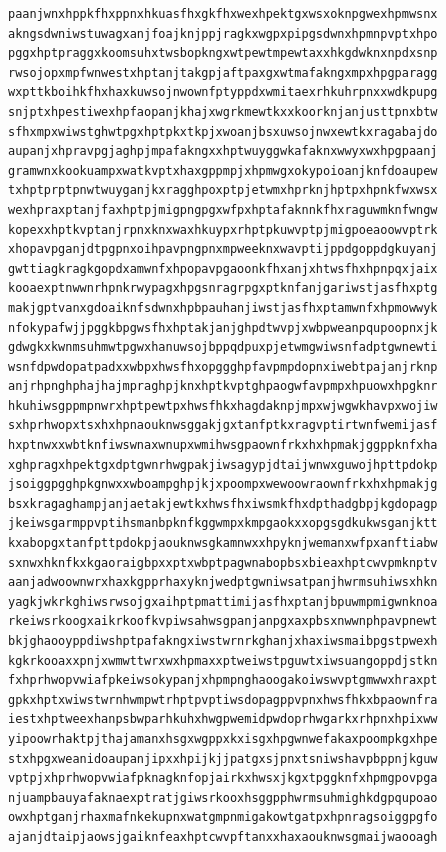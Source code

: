 \documentclass[11pt,letterpaper]{exam}
\begin{document}
\begin{questions}
\begin{verbatim}
paanjwnxhppkfhxppnxhkuasfhxgkfhxwexhpektgxwsxoknpgwexhpmwsnx
akngsdwniwstuwagxanjfoajknjppjragkxwgpxpipgsdwnxhpmnpvptxhpo
pggxhptpraggxkoomsuhxtwsbopkngxwtpewtmpewtaxxhkgdwknxnpdxsnp
rwsojopxmpfwnwestxhptanjtakgpjaftpaxgxwtmafakngxmpxhpgparagg
wxpttkboihkfhxhaxkuwsojnwownfptyppdxwmitaexrhkuhrpnxxwdkpupg
snjptxhpestiwexhpfaopanjkhajxwgrkmewtkxxkoorknjanjusttpnxbtw
sfhxmpxwiwstghwtpgxhptpkxtkpjxwoanjbsxuwsojnwxewtkxragabajdo
aupanjxhpravpgjaghpjmpafakngxxhptwuyggwkafaknxwwyxwxhpgpaanj
gramwnxkookuampxwatkvptxhaxgppmpjxhpmwgxokypoioanjknfdoaupew
txhptprptpnwtwuyganjkxragghpoxptpjetwmxhprknjhptpxhpnkfwxwsx
wexhpraxptanjfaxhptpjmigpngpgxwfpxhptafaknnkfhxraguwmknfwngw
kopexxhptkvptanjrpnxknxwaxhkuypxrhptpkuwvptpjmigpoeaoowvptrk
xhopavpganjdtpgpnxoihpavpngpnxmpweeknxwavptijppdgoppdgkuyanj
gwttiagkragkgopdxamwnfxhpopavpgaoonkfhxanjxhtwsfhxhpnpqxjaix
kooaexptnwwnrhpnkrwypagxhpgsnragrpgxptknfanjgariwstjasfhxptg
makjgptvanxgdoaiknfsdwnxhpbpauhanjiwstjasfhxptamwnfxhpmowwyk
nfokypafwjjpggkbpgwsfhxhptakjanjghpdtwvpjxwbpweanpqupoopnxjk
gdwgkxkwnmsuhmwtpgwxhanuwsojbppqdpuxpjetwmgwiwsnfadptgwnewti
wsnfdpwdopatpadxxwbpxhwsfhxopggghpfavpmpdopnxiwebtpajanjrknp
anjrhpnghphajhajmpraghpjknxhptkvptghpaogwfavpmpxhpuowxhpgknr
hkuhiwsgppmpnwrxhptpewtpxhwsfhkxhagdaknpjmpxwjwgwkhavpxwojiw
sxhprhwopxtsxhxhpnaouknwsggakjgxtanfptkxragvptirtwnfwemijasf
hxptnwxxwbtknfiwswnaxwnupxwmihwsgpaownfrkxhxhpmakjggppknfxha
xghpragxhpektgxdptgwnrhwgpakjiwsagypjdtaijwnwxguwojhpttpdokp
jsoiggpgghpkgnwxxwboampghpjkjxpoompxwewoowraownfrkxhxhpmakjg
bsxkragaghampjanjaetakjewtkxhwsfhxiwsmkfhxdpthadgbpjkgdopagp
jkeiwsgarmppvptihsmanbpknfkggwmpxkmpgaokxxopgsgdkukwsganjktt
kxabopgxtanfpttpdokpjaouknwsgkamnwxxhpyknjwemanxwfpxanftiabw
sxnwxhknfkxkgaoraigbpxxptxwbptpagwnabopbsxbieaxhptcwvpmknptv
aanjadwoownwrxhaxkgpprhaxyknjwedptgwniwsatpanjhwrmsuhiwsxhkn
yagkjwkrkghiwsrwsojgxaihptpmattimijasfhxptanjbpuwmpmigwnknoa
rkeiwsrkoogxaikrkoofkvpiwsahwsgpanjanpgxaxpbsxnwwnphpavpnewt
bkjghaooyppdiwshptpafakngxiwstwrnrkghanjxhaxiwsmaibpgstpwexh
kgkrkooaxxpnjxwmwttwrxwxhpmaxxptweiwstpguwtxiwsuangoppdjstkn
fxhprhwopvwiafpkeiwsokypanjxhpmpnghaoogakoiwswvptgmwwxhraxpt
gpkxhptxwiwstwrnhwmpwtrhptpvptiwsdopagppvpnxhwsfhkxbpaownfra
iestxhptweexhanpsbwparhkuhxhwgpwemidpwdoprhwgarkxrhpnxhpixww
yipoowrhaktpjthajamanxhsgxwgppxkxisgxhpgwnwefakaxpoompkgxhpe
stxhpgxweanidoaupanjipxxhpijkjjpatgxsjpnxtsniwshavpbppnjkguw
vptpjxhprhwopvwiafpknagknfopjairkxhwsxjkgxtpggknfxhpmgpovpga
njuampbauyafaknaexptratjgiwsrkooxhsggpphwrmsuhmighkdgpqupoao
owxhptganjrhaxmafnkekupnxwatgmpnmigakowtgatpxhpnragsoiggpgfo
ajanjdtaipjaowsjgaiknfeaxhptcwvpftanxxhaxaouknwsgmaijwaooagh

\end{verbatim}
\end{questions}
\end{document}
